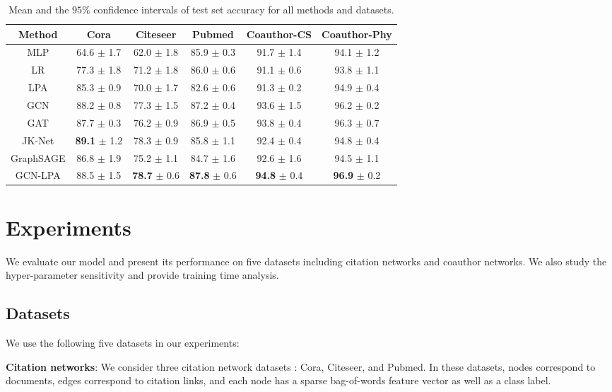 \documentclass{article}
\begin{document}
		\begin{table*}[t]
			\centering
			\setlength{\tabcolsep}{12pt}
			\begin{tabular}{c|ccccc}
				\hline
				Method & \textbf{Cora} & \textbf{Citeseer} & \textbf{Pubmed} & \textbf{Coauthor-CS} & \textbf{Coauthor-Phy} \\
				\hline
				MLP & 64.6 $\pm$ 1.7 & 62.0 $\pm$ 1.8 & 85.9 $\pm$ 0.3 & 91.7 $\pm$ 1.4 & 94.1 $\pm$ 1.2 \\
				LR & 77.3 $\pm$ 1.8 & 71.2 $\pm$ 1.8 & 86.0 $\pm$ 0.6 & 91.1 $\pm$ 0.6 & 93.8 $\pm$ 1.1 \\
				\hline
				LPA & 85.3 $\pm$ 0.9 & 70.0 $\pm$ 1.7 & 82.6 $\pm$ 0.6 & 91.3 $\pm$ 0.2 & 94.9 $\pm$ 0.4  \\
				\hline
				GCN & 88.2 $\pm$ 0.8 & 77.3 $\pm$ 1.5 & 87.2 $\pm$ 0.4 & 93.6 $\pm$ 1.5 & 96.2 $\pm$ 0.2 \\
				GAT & 87.7 $\pm$ 0.3 & 76.2 $\pm$ 0.9 & 86.9 $\pm$ 0.5 & 93.8 $\pm$ 0.4 & 96.3 $\pm$ 0.7 \\
				JK-Net & \textbf{89.1} $\pm$ 1.2 & 78.3 $\pm$ 0.9 & 85.8 $\pm$ 1.1 & 92.4 $\pm$ 0.4 & 94.8 $\pm$ 0.4 \\
				GraphSAGE & 86.8 $\pm$ 1.9 & 75.2 $\pm$ 1.1 & 84.7 $\pm$ 1.6 & 92.6 $\pm$ 1.6 & 94.5 $\pm$ 1.1 \\
				\hline
				GCN-LPA & 88.5 $\pm$ 1.5 & \textbf{78.7} $\pm$ 0.6 & \textbf{87.8} $\pm$ 0.6 & \textbf{94.8} $\pm$ 0.4 & \textbf{96.9} $\pm$ 0.2 \\
				\hline
			\end{tabular}
			\caption{Mean and the $95\%$ confidence intervals of test set accuracy for all methods and datasets.}
			\label{table:random_split}
		\end{table*}

\section{Experiments}
	We evaluate our model and present its performance on five datasets including citation networks and coauthor networks.
	We also study the hyper-parameter sensitivity and provide training time analysis.

	\subsection{Datasets}
		We use the following five datasets in our experiments:
		
		\textbf{Citation networks}:
		We consider three citation network datasets \citep{sen2008collective}:
		Cora, Citeseer, and Pubmed.
		In these datasets, nodes correspond to documents, edges correspond to citation links, and each node has a sparse bag-of-words feature vector as well as a class label.
		
\end{document}
